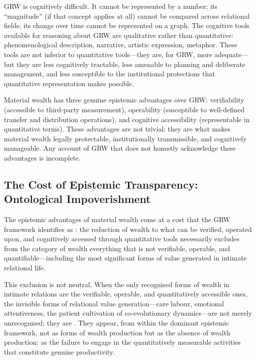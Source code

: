 GRW is cognitively difficult. It cannot be represented by a number; its ``magnitude'' (if that concept applies at all) cannot be compared across relational fields; its change over time cannot be represented on a graph. The cognitive tools available for reasoning about GRW are qualitative rather than quantitative: phenomenological description, narrative, artistic expression, metaphor. These tools are not inferior to quantitative tools---they are, for GRW, more adequate---but they are less cognitively tractable, less amenable to planning and deliberate management, and less susceptible to the institutional protections that quantitative representation makes possible.

\begin{claim}
Material wealth has three genuine epistemic advantages over GRW: verifiability (accessible to third-party measurement), operability (susceptible to well-defined transfer and distribution operations), and cognitive accessibility (representable in quantitative terms). These advantages are not trivial: they are what makes material wealth legally protectable, institutionally transmissible, and cognitively manageable. Any account of GRW that does not honestly acknowledge these advantages is incomplete.
\end{claim}

\subsection{The Cost of Epistemic Transparency: Ontological Impoverishment}
\label{p15:subsec:epistemic_cost}

\noindent
The epistemic advantages of material wealth come at a cost that the GRW framework identifies as : the reduction of wealth to what can be verified, operated upon, and cognitively accessed through quantitative tools necessarily excludes from the category of wealth everything that is not verifiable, operable, and quantifiable---including the most significant forms of value generated in intimate relational life.

This exclusion is not neutral. When the only recognised forms of wealth in intimate relations are the verifiable, operable, and quantitatively accessible ones, the invisible forms of relational value generation---care labour, emotional attentiveness, the patient cultivation of co-evolutionary dynamics---are not merely unrecognised; they are . They appear, from within the dominant epistemic framework, not as forms of wealth production but as the absence of wealth production: as the failure to engage in the quantitatively measurable activities that constitute genuine productivity.

